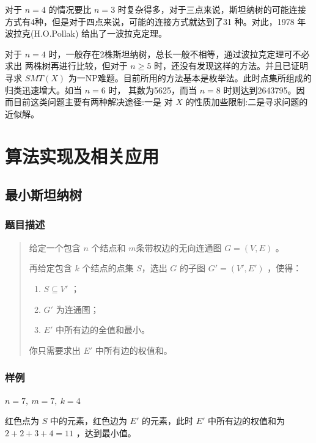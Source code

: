 \documentclass{SCIS2022cn}
\begin{document}
对于 $n=4$ 的情况要比 $n=3$ 时复杂得多，对于三点来说，斯坦纳树的可能连接方式有4种，但是对于四点来说，可能的连接方式就达到了31\cite{2} 种。对此，1978 年波拉克(H.O.Pollak) 给出了一波拉克定理。

对于 $n=4$ 时，一般存在2株斯坦纳树，总长一般不相等，通过波拉克定理可不必求出 两株树再进行比较，但对于 $n \geq 5$ 时，还没有发现这样的方法。并且已证明寻求 $SMT(X)$ 为一NP难题。目前所用的方法基本是枚举法。此时点集所组成的归类迅速增大。如当 $n=6$ 时， 其数为5625，而当 $n=8$ 时则达到2643795。因而目前这类问题主要有两种解决途径:一是 对 $X$ 的性质加些限制:二是寻求问题的近似解。

\section{算法实现及相关应用}

\subsection{最小斯坦纳树}

\subsubsection*{题目描述}

\begin{quotation}
    给定一个包含 $n$ 个结点和 $m$条带权边的无向连通图 $G=(V,E)$ 。

    再给定包含 $k$ 个结点的点集 $S$，选出 $G$ 的子图 $G'=(V',E')$ ，使得：
    \begin{enumerate}
        \item $S \subseteq V'$ ；
        \item $G'$ 为连通图；
        \item $E'$ 中所有边的全值和最小。
    \end{enumerate}

    你只需要求出 $E'$ 中所有边的权值和。
\end{quotation}

\subsubsection*{样例}

$n=7,\ m=7,\ k=4$

红色点为 $S$ 中的元素，红色边为 $E'$ 的元素，此时 $E'$ 中所有边的权值和为 $2+2+3+4=11$ ，达到最小值。
\end{document}
